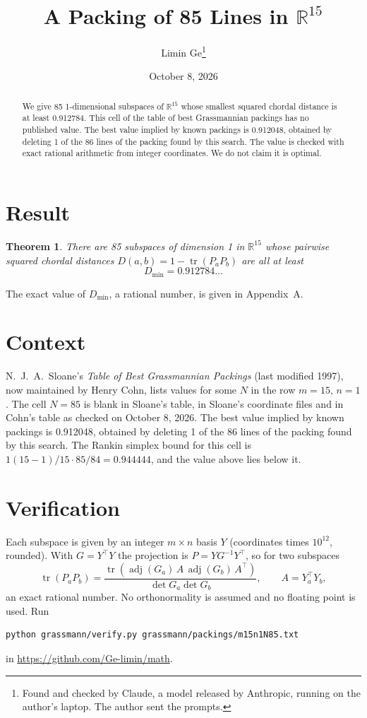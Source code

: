 \documentclass[11pt,a4paper]{article}
\title{A Packing of 85 Lines in $\mathbb{R}^{15}$}
\author{Limin Ge\thanks{Found and checked by Claude, a model released by Anthropic, running on the author's laptop. The author sent the prompts.}}
\date{October 8, 2026}
\newtheorem*{theorem}{Theorem}
\begin{document}
\maketitle
\begin{abstract}
We give 85 1-dimensional subspaces of $\mathbb{R}^{15}$ whose smallest squared chordal distance is at least 0.912784. This cell of the table of best Grassmannian packings has no published value. The best value implied by known packings is 0.912048, obtained by deleting 1 of the 86 lines of the packing found by this search. The value is checked with exact rational arithmetic from integer coordinates. We do not claim it is optimal.
\end{abstract}

\section{Result}
\begin{theorem}
There are 85 subspaces of dimension 1 in $\mathbb{R}^{15}$ whose pairwise squared chordal distances $D(a,b) = 1 - \operatorname{tr}(P_aP_b)$ are all at least
\[ D_{\min} = 0.912784\ldots \]
\end{theorem}
The exact value of $D_{\min}$, a rational number, is given in Appendix~A.


\section{Context}
N.~J.~A.~Sloane's \emph{Table of Best Grassmannian Packings} (last modified 1997), now maintained by Henry Cohn, lists values for some $N$ in the row $m=15$, $n=1$. The cell $N=85$ is blank in Sloane's table, in Sloane's coordinate files and in Cohn's table as checked on October 8, 2026. The best value implied by known packings is 0.912048, obtained by deleting 1 of the 86 lines of the packing found by this search. The Rankin simplex bound for this cell is $1(15-1)/15\cdot 85/84 = 0.944444$, and the value above lies below it.


\section{Verification}
Each subspace is given by an integer $m\times n$ basis $Y$ (coordinates times $10^{12}$, rounded). With $G=Y^\top Y$ the projection is $P=YG^{-1}Y^\top$, so for two subspaces
\[ \operatorname{tr}(P_aP_b)=\frac{\operatorname{tr}(\operatorname{adj}(G_a)\,A\,\operatorname{adj}(G_b)\,A^\top)}{\det G_a\det G_b},\qquad A=Y_a^\top Y_b, \]
an exact rational number. No orthonormality is assumed and no floating point is used. Run
\begin{verbatim}
python grassmann/verify.py grassmann/packings/m15n1N85.txt
\end{verbatim}
in \url{https://github.com/Ge-limin/math}.
\end{document}
